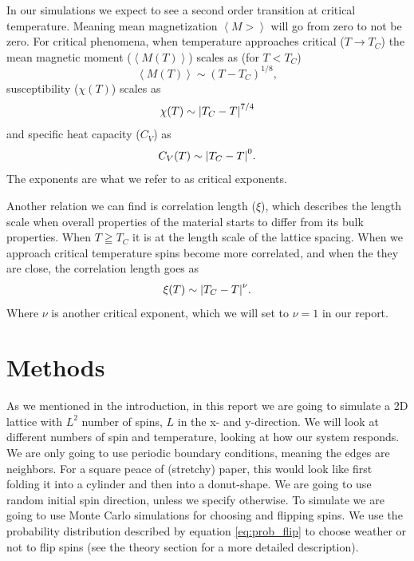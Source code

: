 \documentclass[reprint, english,notitlepage,nofootinbib]{revtex4-1}  %
\begin{document}
In our simulations we expect to see a second order transition at critical temperature. Meaning mean magnetization $\left<M>\right>$ will go from zero to not be zero. For critical phenomena, when temperature approaches critical ($T\rightarrow T_C$) the mean magnetic moment ($\left<M(T)\right>$) scales as (for $T<T_C$)
\begin{equation}
	\label{eq:critical_M}
 	\left<M(T)\right> \sim \left(T - T_C\right)^{1/8},
\end{equation}
susceptibility ($\chi(T)$) scales as
\begin{equation}
	\label{eq:critical_chi}
	\chi(T) \sim \abs{T_C - T}^{7/4}
\end{equation}
and specific heat capacity ($C_V$) as
\begin{equation}
	\label{eq:critical_Cv}
	C_V(T) \sim \abs{T_C - T}^0.
\end{equation}
The exponents are what we refer to as critical exponents.

Another relation we can find is correlation length ($\xi$), which describes the length scale when overall properties of the material starts to differ from its bulk properties. When $T\geqq T_C$ it is at the length scale of the lattice spacing. When we approach critical temperature spins become more correlated, and when the they are close, the correlation length goes as
\begin{equation}
	\label{eq:critical_ksi}
	\xi(T) \sim \abs{T_C - T}^\nu.
\end{equation}
Where $\nu$ is another critical exponent, which we will set to $\nu=1$ in our report.

\section{Methods}

As we mentioned in the introduction, in this report we are going to simulate a 2D lattice with $L^2$ number of spins, $L$ in the x- and y-direction. We will look at different numbers of spin and temperature, looking at how our system responds. We are only going to use periodic boundary conditions, meaning the edges are neighbors. For a square peace of (stretchy) paper, this would look like first folding it into a cylinder and then into a donut-shape. We are going to use random initial spin direction, unless we specify otherwise. To simulate we are going to use Monte Carlo simulations for choosing and flipping spins. We use the probability distribution described by equation \eqref{eq:prob_flip} to choose weather or not to flip spins (see the theory section for a more detailed description).
\end{document}
